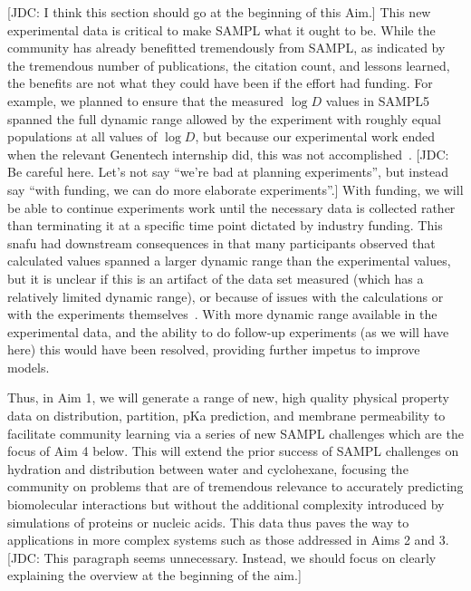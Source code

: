 \documentclass[11pt]{article}
\begin{document}
{\color{red}[JDC: I think this section should go at the beginning of this Aim.]}
This new experimental data is critical to make SAMPL what it ought to be. 
While the community has already benefitted tremendously from SAMPL, as indicated by the tremendous number of publications, the citation count, and lessons learned, the benefits are not what they could have been if the effort had funding.
For example, we planned to ensure that the measured $\log D$ values in SAMPL5 spanned the full dynamic range allowed by the experiment with roughly equal populations at all values of $\log D$, but because our experimental work ended when the relevant Genentech internship did, this was not accomplished~\cite{rustenburg_measuring_2016, bannan_blind_2016}. 
{\color{red}[JDC: Be careful here. Let's not say ``we're bad at planning experiments'', but instead say ``with funding, we can do more elaborate experiments''.]}
With funding, we will be able to continue experiments work until the necessary data is collected rather than terminating it at a specific time point dictated by industry funding.
This snafu had downstream consequences in that many participants observed that calculated values spanned a larger dynamic range than the experimental values, but it is unclear if this is an artifact of the data set measured (which has a relatively limited dynamic range), or because of issues with the calculations or with the experiments themselves~\cite{rustenburg_measuring_2016, bannan_blind_2016, paranahewage_predicting_2016, klamt_prediction_2016}. 
With more dynamic range available in the experimental data, and the ability to do follow-up experiments (as we will have here) this would have been resolved, providing further impetus to improve models.

Thus, in Aim 1, we will generate a range of new, high quality physical property data on distribution, partition, pKa prediction, and membrane permeability to facilitate community learning via a series of new SAMPL challenges which are the focus of Aim 4 below. 
This will extend the prior success of SAMPL challenges on hydration and distribution between water and cyclohexane, focusing the community on problems that are of tremendous relevance to accurately predicting biomolecular interactions but without the additional complexity introduced by simulations of proteins or nucleic acids.
This data thus paves the way to applications in more complex systems such as those addressed in Aims 2 and 3.
{\color{red}[JDC: This paragraph seems unnecessary. Instead, we should focus on clearly explaining the overview at the beginning of the aim.]}
\end{document}
